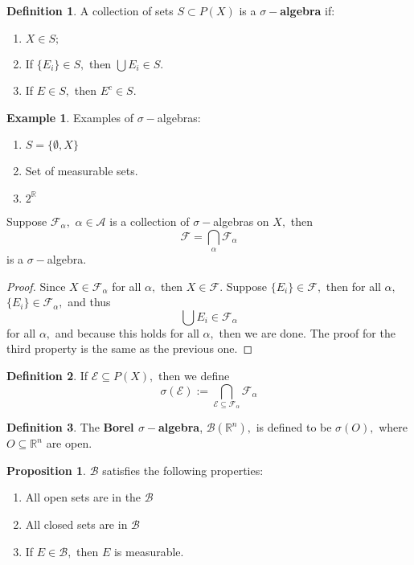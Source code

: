 \documentclass[10pt, oneside]{article}
\newcommand{\bbR}{\mathbb{R}}
\theoremstyle{definition}
\newtheorem{exmp}{Example}[section]
\newtheorem{defn}{Definition}
\newtheorem{prop}{Proposition}
\begin{document}
\begin{defn}
    A collection of sets $S\subset P(X)$ is a \textbf{$\sigma-$algebra} if:
    \begin{enumerate}
        \item $X \in S;$
        \item If $\{E_i\} \in S,$ then $\bigcup E_i \in S.$
        \item If $E \in S,$ then $E^c \in S.$
    \end{enumerate}
\end{defn}
\begin{exmp}
Examples of $\sigma-$algebras:
    \begin{enumerate}
        \item $S = \{\emptyset, X\}$
        \item Set of measurable sets.
        \item $2^\bbR$
    \end{enumerate}
\end{exmp}
\begin{lemma}
    Suppose $\mathcal{F}_\alpha,$ $\alpha \in \mathcal{A}$  is a collection of $\sigma-$algebras on $X,$ then 
    \[\mathcal{F} = \bigcap_\alpha \mathcal{F}_\alpha\] is a $\sigma-$algebra.
\end{lemma}
\begin{proof}
    Since $X \in \mathcal{F}_\alpha$ for all $\alpha,$ then $X\in \mathcal{F}.$ Suppose $\{E_i\}\in \mathcal{F},$ then for all $\alpha,$ $\{E_i\} \in \mathcal{F}_\alpha,$ and thus
    \[\bigcup E_i \in \mathcal{F_\alpha}\] for all $\alpha,$ and because this holds for all $\alpha,$ then we are done. The proof for the third property is the same as the previous one.
\end{proof}
\begin{defn}
    If $\mathcal{E} \subseteq P(X),$ then we define
    \[\sigma(\mathcal{E}) := \bigcap_{\mathcal{E}\subseteq \mathcal{F}_\alpha} \mathcal{F}_\alpha\]
\end{defn}
\begin{defn}
    The \textbf{Borel $\sigma-$algebra}, $\mathcal{B}(\bbR^n),$ is defined to be $\sigma(O),$ where $O \subseteq \bbR^n$ are open.
\end{defn}
\begin{prop}
$\mathcal{B}$ satisfies the following properties:
    \begin{enumerate}
        \item All open sets are in the $\mathcal{B}$
        \item All closed sets are in $\mathcal{B}$
        \item If $E \in \mathcal{B},$ then $E$ is measurable.
    \end{enumerate}
\end{prop}
\end{document}
